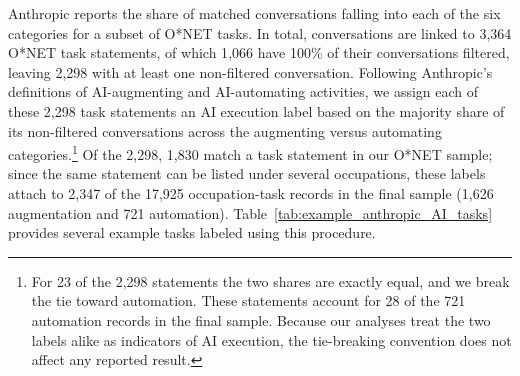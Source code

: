 Anthropic reports the share of matched conversations falling into each of the six categories for a subset of O*NET tasks.
In total, conversations are linked to 3{,}364 O*NET task statements, of which 1{,}066 have 100\% of their conversations filtered, leaving 2{,}298 with at least one non-filtered conversation.
Following Anthropic's definitions of AI-augmenting and AI-automating activities, we assign each of these 2{,}298 task statements an AI execution label based on the majority share of its non-filtered conversations across the augmenting versus automating categories.\footnote{For 23 of the 2{,}298 statements the two shares are exactly equal, and we break the tie toward automation. These statements account for 28 of the 721 automation records in the final sample. Because our analyses treat the two labels alike as indicators of AI execution, the tie-breaking convention does not affect any reported result.}
Of the 2{,}298, 1{,}830 match a task statement in our O*NET sample; since the same statement can be listed under several occupations, these labels attach to 2{,}347 of the 17{,}925 occupation-task records in the final sample (1{,}626 augmentation and 721 automation).
Table~\ref{tab:example_anthropic_AI_tasks} provides several example tasks labeled using this procedure. 

